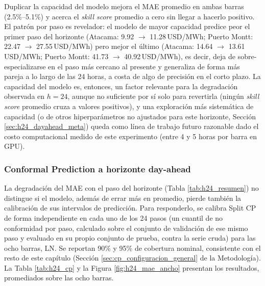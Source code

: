 Duplicar la capacidad del modelo mejora el MAE promedio en ambas barras (2.5\%--5.1\%) y acerca el \textit{skill score} promedio a cero sin llegar a hacerlo positivo. El patrón por paso es revelador: el modelo de mayor capacidad predice peor el primer paso del horizonte (Atacama: 9.92 $\to$ 11.28\,USD/MWh; Puerto Montt: 22.47 $\to$ 27.55\,USD/MWh) pero mejor el último (Atacama: 14.64 $\to$ 13.61\,USD/MWh; Puerto Montt: 41.73 $\to$ 40.92\,USD/MWh), es decir, deja de sobre-especializarse en el paso más cercano al presente y generaliza de forma más pareja a lo largo de las 24 horas, a costa de algo de precisión en el corto plazo. La capacidad del modelo es, entonces, un factor relevante para la degradación observada en $h=24$, aunque no suficiente por sí solo para revertirla (ningún \textit{skill score} promedio cruza a valores positivos), y una exploración más sistemática de capacidad (o de otros hiperparámetros no ajustados para este horizonte, Sección \ref{sec:h24_dayahead_meta}) queda como línea de trabajo futuro razonable dado el costo computacional medido de este experimento (entre 4 y 5 horas por barra en GPU).

\subsubsection{Conformal Prediction a horizonte day-ahead}
\label{sec:h24_cp}

La degradación del MAE con el paso del horizonte (Tabla \ref{tab:h24_resumen}) no distingue si el modelo, además de errar más en promedio, pierde también la calibración de sus intervalos de predicción. Para responderlo, se calibra Split CP de forma independiente en cada uno de los 24 pasos (un cuantil de no conformidad por paso, calculado sobre el conjunto de validación de ese mismo paso y evaluado en su propio conjunto de prueba, contra la serie cruda) para las ocho barras, LN. Se reportan 90\% y 95\% de cobertura nominal, consistente con el resto de este capítulo (Sección \ref{sec:cp_configuracion_general} de la Metodología). La Tabla \ref{tab:h24_cp} y la Figura \ref{fig:h24_mae_ancho} presentan los resultados, promediados sobre las ocho barras.

